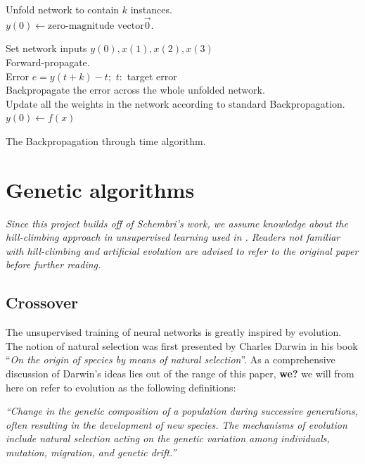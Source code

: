 \documentclass[10pt,a4paper,DIV=11]{scrreprt}
\begin{document}
\begin{algorithm}
\LinesNumbered
\DontPrintSemicolon
\BlankLine
{}
\BlankLine
\Begin
{
    Unfold network to contain $k$ instances.\\
    $y(0) \leftarrow \text{zero-magnitude vector} \overrightarrow{0}$.
    
    {
        Set network inputs $y(0), x(1), x(2), x(3)$\\
        Forward-propagate.\\ 
        Error $e = y(t+k) - t;$ $t:$ target error\\
        Backpropagate the error across the whole unfolded network.\\
        Update all the weights in the network according to standard Backpropagation.\\
        $y(0) \leftarrow f(x)$

    
    }
}
\caption{The Backpropagation through time algorithm.}
\label{alg:GD}
\end{algorithm}

\section{Genetic algorithms}
\textit{Since this project builds off of Schembri's work, we assume knowledge about the hill-climbing approach in unsupervised learning used in \cite{DANIEL}. Readers not
familiar with hill-climbing and artificial evolution are advised to refer to the original paper before further reading.} 

\subsection{Crossover}
The unsupervised training of neural networks is greatly inspired by evolution. The notion of natural selection was first presented by Charles Darwin in his book “\textit{On the origin of species by means of natural selection}”\cite{DARWIN}. 
As a comprehensive discussion of Darwin's ideas lies out of the range of this paper, \textbf{we?} we will from here on refer to evolution as the following definitions\cite{OXFORD}:

\begin{center}
\textit{“Change in the genetic composition of a population during successive generations, often resulting in the development of new species. The mechanisms of evolution include natural selection acting on the genetic variation among individuals, mutation, migration, and genetic drift.”}\\
\end{center}
\end{document}
